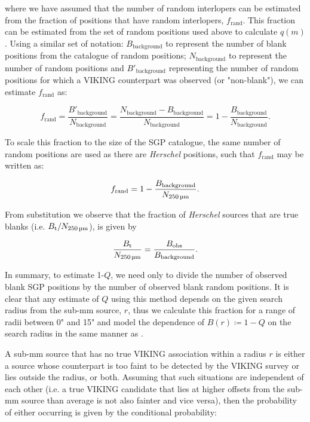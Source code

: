 where we have assumed that the number of random interlopers can be estimated from the fraction of positions that have random interlopers, $f_{\textrm{rand}}$. This fraction can be estimated from the set of random positions used above to calculate $q(m)$. Using a similar set of notation: $B_{\textrm{background}}$ to represent the number of blank positions from the catalogue of random positions; $N_{\textrm{background}}$ to represent the number of random positions and $B'_{\textrm{background}}$ representing the number of random positions for which a VIKING counterpart was observed (or "non-blank"), we can estimate $f_{\textrm{rand}}$ as:

\begin{equation}
    f_{\textrm{rand}} = \frac{B'_{\textrm{background}}}{N_{\textrm{background}}} = \frac{N_{\textrm{background}} - B_{\textrm{background}}}{N_{\textrm{background}}} = 1 - \frac{B_{\textrm{background}}}{N_{\textrm{background}}}.
\end{equation}

To scale this fraction to the size of the SGP catalogue, the same number of random positions are used as there are \textit{Herschel} positions, such that $f_{\textrm{rand}}$ may be written as:

\begin{equation}
    f_{\textrm{rand}} = 1 - \frac{B_{\textrm{background}}}{N_{\textrm{250\,\micron}}}.
\end{equation}

From substitution we observe that the fraction of \textit{Herschel} sources that are true blanks (i.e. $B_{\textrm{t}}/N_{\textrm{250\,\micron}}$), is given by

\begin{equation}
    \frac{B_{\textrm{t}}}{N_{\textrm{250\,\micron}}} = \frac{B_{\textrm{obs}}}{B_{\textrm{background}}}.
\end{equation}

In summary, to estimate 1-$Q$, we need only to divide the number of observed blank SGP positions by the number of observed blank random positions. It is clear that any estimate of $Q$ using this method depends on the given search radius from the sub-mm source, $r$, thus we calculate this fraction for a range of radii between 0" and 15" and model the dependence of $B(r) \coloneqq 1 - Q$ on the search radius in the same manner as \citealt{Fleuren_2012}. 

A sub-mm source that has no true VIKING association within a radius $r$ is either a source whose counterpart is too faint to be detected by the VIKING survey or lies outside the radius, or both. Assuming that such situations are independent of each other (i.e. a true VIKING candidate that lies at higher offsets from the sub-mm source than average is not also fainter and vice versa), then the probability of either occurring is given by the conditional probability:

